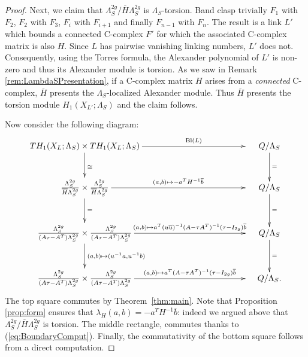 \documentclass[11pt,a4paper]{amsart}
\theoremstyle{definition}
\def\op{\operatorname}
\begin{document}
\begin{proof}
Next, we claim that $\Lambda_S^{2g}/\overline{H} \Lambda_S^{2g}$ is $\Lambda_S$-torsion. Band clasp trivially $F_1$ with $F_2$, $F_2$ with $F_3$, $F_i$ with $F_{i+1}$ and finally $F_{n-1}$ with $F_n$. The result is a link $L'$ which bounds a connected C-complex $F'$ for which the associated C-complex matrix is also $H$. Since $L$ has pairwise vanishing linking numbers, $L'$ does not. Consequently, using the Torres formula, the Alexander polynomial of $L'$ is non-zero and thus its Alexander module is torsion. As we saw in Remark \ref{rem:LambdaSPresentation}, if a C-complex matrix $H$ arises from a \emph{connected} C-complex, $\overline{H}$ presents the $\Lambda_S$-localized Alexander module. Thus $\overline{H}$ presents the torsion module $H_1(X_{L'};\Lambda_S)$ and the claim follows.

 Now consider the following diagram: 
\begin{equation}
\label{eq:BoundaryDiagram}
\xymatrix@R0.4cm@C0.2cm{TH_1(X_L;\Lambda_S)\times TH_1(X_L;\Lambda_S)\ar[rrrrrrrrrrr]^-{\op{Bl}(L)}\ar[dd]^\cong 
&&&&&&&&&&&&Q/\Lambda_S\ar[dd]^=\\
 \\
 \frac{\Lambda_S^{2g}}{\overline{H}\Lambda_S^{2g}} \times   \frac{\Lambda_S^{2g}}{\overline{H}\Lambda_S^{2g}} \ar[rrrrrrrrrrr]^-{(a,b) \mapsto -a^T H^{-1}\overline{b}}\ar[dd]^{=}
  &&&&&&&&&&&&Q/\Lambda_S\ar[dd]^=\\\\
\frac{\Lambda_S^{2g}}{(A\tau -A^T)\Lambda_S^{2g}} \times  \frac{\Lambda_S^{2g}}{(A\tau -A^T)\Lambda_S^{2g}}  \ar[rrrrrrrrrrr]^-{(a,b) \mapsto a^T (u\overline{u})^{-1}(A-\tau A^T)^{-1}(\tau-I_{2g})\overline{b}}\ar[dd]^{(a,b)\mapsto (u^{-1}a,u^{-1}b)} 
&&&&&&&&&&&&Q/\Lambda_S\ar[dd]^=\\\\
\frac{\Lambda_S^{2g}}{(A\tau-A^T)\Lambda_S^{2g}}  \times  \frac{\Lambda_S^{2g}}{(A\tau -A^T)\Lambda_S^{2g}}  \ar[rrrrrrrrrrr]^-{(a,b) \mapsto a^T (A-\tau A^T)^{-1}(\tau-I_{2g})\overline{b}}
 &&&&&&&&&&&&Q/\Lambda_S.\\
}
\end{equation}
The top square commutes by Theorem~\ref{thm:main}. Note that Proposition \ref{prop:form} ensures that $\lambda_H(a,b)=-a^T H^{-1} \overline{b}$: indeed we argued above that $\Lambda_S^{2g}/\overline{H}\Lambda_S^{2g}$ is torsion. The middle rectangle, commutes thanks to (\ref{eq:BoundaryComput}). Finally, the commutativity of the bottom square follows from a direct computation.
\end{proof}
\end{document}
